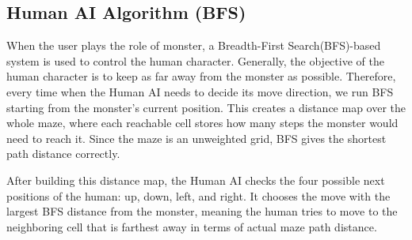 \subsection{Human AI Algorithm (BFS)}

When the user plays the role of monster, 
a Breadth-First Search(BFS)-based system is used to control the human character. 
Generally, the objective of the human character is to keep as far away from the monster as possible.
Therefore, every time when the Human AI needs to decide its move direction,
we run BFS starting from the monster's current position.
This creates a distance map over the whole maze, 
where each reachable cell stores how many steps the monster would need to reach it.
Since the maze is an unweighted grid, BFS gives the shortest path distance correctly.

After building this distance map, 
the Human AI checks the four possible next positions of the human: 
up, down, left, and right. 
It chooses the move with the largest BFS distance from the monster, 
meaning the human tries to move to the neighboring cell 
that is farthest away in terms of actual maze path distance.
